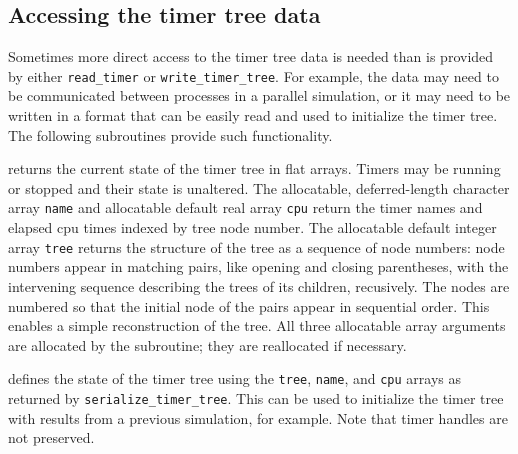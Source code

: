 \documentclass[11pt]{article}
\begin{document}
\subsection{Accessing the timer tree data}
Sometimes more direct access to the timer tree data is needed than is
provided by either \texttt{read_timer} or \texttt{write_timer_tree}.
For example, the data may need to be communicated between processes in
a parallel simulation, or it may need to be written in a format that
can be easily read and used to initialize the timer tree.
The following subroutines provide such functionality.
\begin{description}[style=nextline]\setlength{\itemsep}{0pt}
\item[\texttt{call serialize_timer_tree (tree, name, cpu)}]
  returns the current state of the timer tree in flat arrays.  Timers may
  be running or stopped and their state is unaltered.  The allocatable,
  deferred-length character array \texttt{name} and allocatable default real
  array \texttt{cpu} return the timer names and elapsed cpu times indexed by
  tree node number.  The allocatable default integer array \texttt{tree}
  returns the structure of the tree as a sequence of node numbers:
  node numbers appear in matching pairs, like opening and closing parentheses,
  with the intervening sequence describing the trees of its children,
  recusively.  The nodes are numbered so that the initial node of the pairs
  appear in sequential order.  This enables a simple reconstruction of the
  tree.  All three allocatable array arguments are allocated by the
  subroutine; they are reallocated if necessary.
\item[\texttt{call deserialize_timer_tree (tree, name, cpu)}]
  defines the state of the timer tree using the \texttt{tree}, \texttt{name},
  and \texttt{cpu} arrays as returned by \texttt{serialize_timer_tree}. This
  can be used to initialize the timer tree with results from a previous
  simulation, for example.  Note that timer handles are not preserved.
\end{description}
\end{document}
